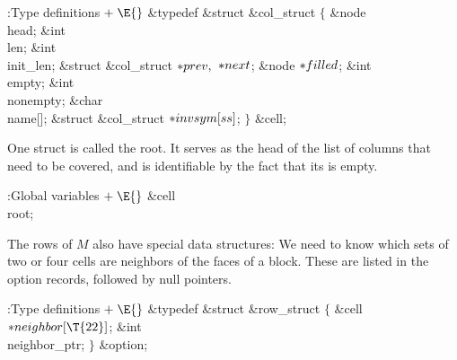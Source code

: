 \Y\B\4:Type definitions\X${}\mathrel+\E{}$\6
\&{typedef} \&{struct} \&{col\_struct} ${}\{{}$\1\6
\&{node} \\{head};\6
\&{int} \\{len};\6
\&{int} \\{init\_len};%
\6
\&{struct} \&{col\_struct} ${}{*}\\{prev},{}$ ${}{*}\\{next}{}$;\6
\&{node} ${}{*}\\{filled}{}$;\6
\&{int} \\{empty};\6
\&{int} \\{nonempty};\6
\&{char} \\{name}[];\6
\&{struct} \&{col\_struct} ${}{*}\\{invsym}[\\{ss}]{}$;\2\6
${}\}{}$ \&{cell};\par
\fi

One  struct is called the root. It serves as the head of the
list of columns that need to be covered, and is identifiable by the fact
that its  is empty.

\Y\B\4:Global variables\X${}\mathrel+\E{}$\6
\&{cell} \\{root};\par
\fi

The rows of $M$ also have special data structures:
We need to know which sets of two or four cells are neighbors of the
faces of a block. These are listed in the option records,
followed by null pointers.

\Y\B\4:Type definitions\X${}\mathrel+\E{}$\6
\&{typedef} \&{struct} \&{row\_struct} ${}\{{}$\1\6
\&{cell} ${}{*}\\{neighbor}[\T{22}]{}$;\6
\&{int} \\{neighbor\_ptr};\2\6
${}\}{}$ \&{option};\par
\fi

